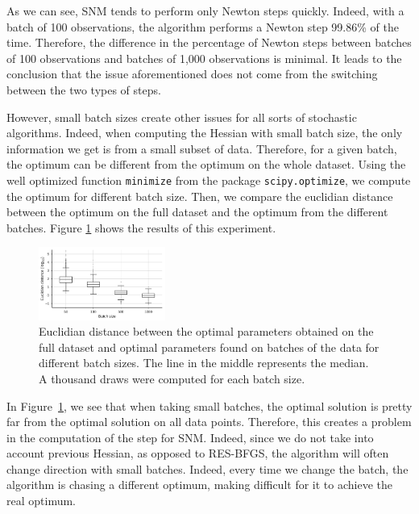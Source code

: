 \documentclass[conference]{IEEEtran}
\begin{document}
As we can see, SNM tends to perform only Newton steps quickly. Indeed, with a batch of 100 observations, the algorithm performs a Newton step 99.86\% of the time. Therefore, the difference in the percentage of Newton steps between batches of 100 observations and batches of 1,000 observations is minimal. It leads to the conclusion that the issue aforementioned does not come from the switching between the two types of steps.

However, small batch sizes create other issues for all sorts of stochastic algorithms. Indeed, when computing the Hessian with small batch size, the only information we get is from a small subset of data. Therefore, for a given batch, the optimum can be different from the optimum on the whole dataset. Using the well optimized function \texttt{minimize} from the package \texttt{scipy.optimize}, we compute the optimum for different batch size. Then, we compare the euclidian distance between the optimum on the full dataset and the optimum from the different batches. Figure \ref{fig:batch_dist} shows the results of this experiment.

\begin{figure}[t]
\centering
\includegraphics[width=0.37\textwidth]{../figures/dist.pdf}
\vspace{-0.3cm}
\caption{Euclidian distance between the optimal parameters obtained on the full dataset and optimal parameters found on batches of the data for different batch sizes. The line in the middle represents the median. A thousand draws were computed for each batch size.}
\label{fig:batch_dist}
\vspace{-0.5cm}
\end{figure}

In Figure~\ref{fig:batch_dist}, we see that when taking small batches, the optimal solution is pretty far from the optimal solution on all data points. Therefore, this creates a problem in the computation of the step for SNM. Indeed, since we do not take into account previous Hessian, as opposed to RES-BFGS, the algorithm will often change direction with small batches. Indeed, every time we change the batch, the algorithm is chasing a different optimum, making difficult for it to achieve the real optimum. 
\end{document}
